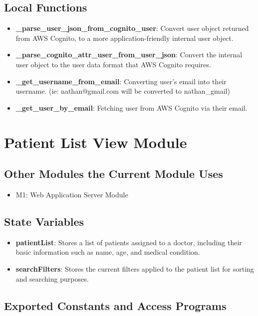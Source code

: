 \documentclass[12pt, titlepage]{article}
\begin{document}
\subsection{Local Functions}
\begin{itemize}
    \item \textbf{\_parse\_user\_json\_from\_cognito\_user}: Convert user object returned from AWS Cognito, to a more application-friendly internal user object.
    \item \textbf{\_parse\_cognito\_attr\_user\_from\_user\_json}: Convert the internal user object to the user data format that AWS Cognito requires.
    \item \textbf{\_get\_username\_from\_email}: Converting user's email into their username. (ie: nathan@gmail.com will be converted to nathan\_gmail)
    \item \textbf{\_get\_user\_by\_email}: Fetching user from AWS Cognito via their email. 
\end{itemize}

\newpage
\section{Patient List View Module}

\subsection{Other Modules the Current Module Uses}
\begin{itemize}
    \item M1: Web Application Server Module
\end{itemize}

\subsection{State Variables}
\begin{itemize}
\item \textbf{patientList}: Stores a list of patients assigned to a doctor, including their basic information such as name, age, and medical condition.
\item \textbf{searchFilters}: Stores the current filters applied to the patient list for sorting and searching purposes.
\end{itemize}

\subsection{Exported Constants and Access Programs}
\end{document}

